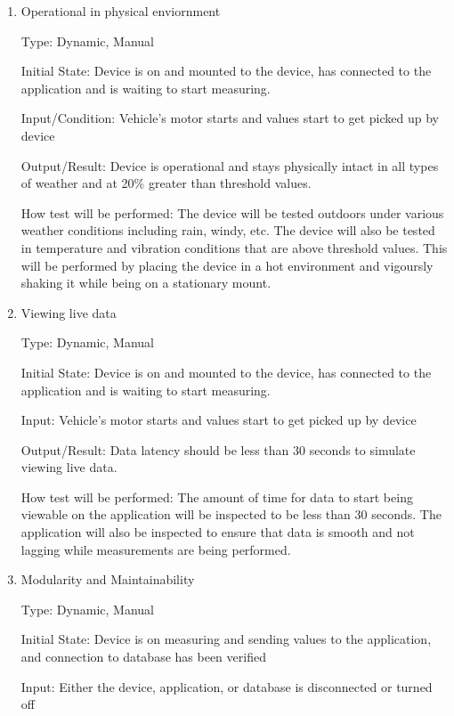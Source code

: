 \documentclass[12pt, titlepage]{article}
\begin{document}
\begin{enumerate}

\item{Operational in physical enviornment\\}

Type: Dynamic, Manual
					
Initial State: Device is on and mounted to the device, has connected to the application and is waiting to start measuring.
					
Input/Condition: Vehicle's motor starts and values start to get picked up by device
					
Output/Result: Device is operational and stays physically intact in all types of weather and at 20\% greater than threshold values.
					
How test will be performed: The device will be tested outdoors under various weather conditions including rain, windy, etc.
The device will also be tested in temperature and vibration conditions that are above threshold values. This will be performed by placing the device in a hot environment
and vigoursly shaking it while being on a stationary mount.
					
\item{Viewing live data\\}

Type: Dynamic, Manual
					
Initial State: Device is on and mounted to the device, has connected to the application and is waiting to start measuring.
					
Input: Vehicle's motor starts and values start to get picked up by device
					
Output/Result: Data latency should be less than 30 seconds to simulate viewing live data.
					
How test will be performed: The amount of time for data to start being viewable on the application will be inspected to be less than 30 seconds.
The application will also be inspected to ensure that data is smooth and not lagging while measurements are being performed.

\item{Modularity and Maintainability\\}

Type: Dynamic, Manual
					
Initial State: Device is on measuring and sending values to the application, and connection to database has been verified
					
Input: Either the device, application, or database is disconnected or turned off
					

\end{enumerate}
\end{document}
